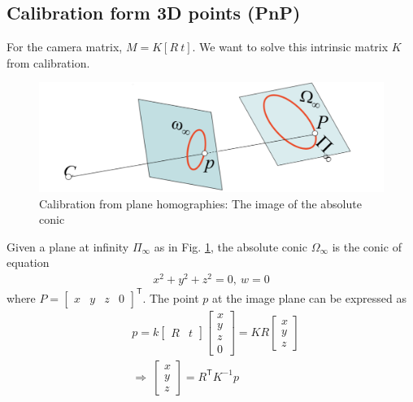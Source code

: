\documentclass[11pt]{article}
\begin{document}
\subsection{Calibration form 3D points (PnP)}
For the camera matrix, $M=K[R\ t]$. We want to solve this intrinsic matrix $K$ from calibration. 
\begin{figure}[H]
\begin{center}
\includegraphics[width=10 cm]{images/calibration.png}
\caption{Calibration from plane homographies: The image of the absolute conic}
\label{calibration}
\end{center}
\end{figure}
Given a plane at infinity $\Pi_\infty$ as in Fig. \ref{calibration}, the absolute conic $\Omega_\infty$ is the conic of equation 
\begin{align}
x^2+y^2+z^2=0, \ w=0
\label{trick1_1}
\end{align}
where $P=\left[\begin{array}{cccc}x & y & z & 0\end{array}\right]^\mathsf{T}$. The point $p$ at the image plane can be expressed as
\begin{align}
&p=k\left[\begin{array}{cc}R & t\end{array}\right]\left[\begin{array}{c}x \\ y \\ z \\ 0\end{array}\right]=KR\left[\begin{array}{c}x \\ y \\ z\end{array}\right] \nonumber\\
&\Longrightarrow \ \left[\begin{array}{c}x \\ y \\ z\end{array}\right]=R^\mathsf{T} K^{-1}p
\label{trick1_2}
\end{align}
\end{document}
